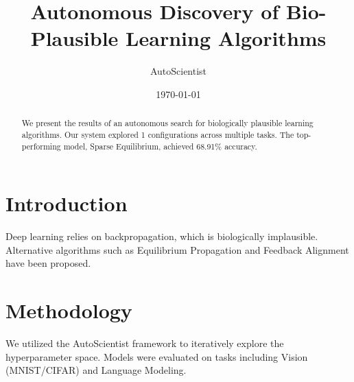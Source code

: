 \documentclass{article}
\title{Autonomous Discovery of Bio-Plausible Learning Algorithms}
\author{AutoScientist}
\date{\today}
\begin{document}
\maketitle
\begin{abstract}
We present the results of an autonomous search for biologically plausible learning algorithms. Our system explored 1 configurations across multiple tasks. The top-performing model, Sparse Equilibrium, achieved 68.91\% accuracy.
\end{abstract}
\section{Introduction}
Deep learning relies on backpropagation, which is biologically implausible. Alternative algorithms such as Equilibrium Propagation \cite{scellier2017equilibrium} and Feedback Alignment \cite{lillicrap2016random} have been proposed.
\section{Methodology}
We utilized the AutoScientist framework to iteratively explore the hyperparameter space. Models were evaluated on tasks including Vision (MNIST/CIFAR) and Language Modeling.
\end{document}
